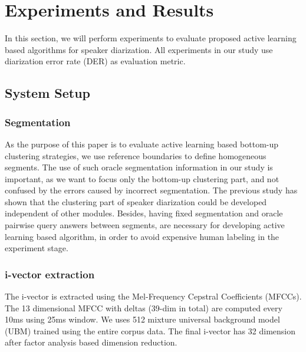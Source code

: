 \documentclass[journal]{IEEEtran}
\begin{document}
\section{Experiments and Results}
In this section, we will perform experiments to evaluate proposed active learning based algorithms for speaker diarization. All experiments in our study use diarization error rate (DER) as evaluation metric.
\subsection{System Setup}
\subsubsection{Segmentation}
As the purpose of this paper is to evaluate active learning based bottom-up clustering strategies, we use reference boundaries to define homogeneous segments. The use of such oracle segmentation information in our study is important, as we want to focus only the bottom-up clustering part, and not confused by the errors caused by incorrect segmentation. The previous study has shown that the clustering part of speaker diarization could be developed independent of other modules. Besides, having fixed segmentation and oracle pairwise query answers between segments, are necessary for developing active learning based algorithm, in order to avoid expensive human labeling in the experiment stage.

\subsubsection{i-vector extraction}
The i-vector is extracted using the Mel-Frequency Cepstral Coefficients (MFCCs). The 13 dimensional MFCC with deltas (39-dim in total) are computed every 10ms using 25ms window. We uses 512 mixture universal background model (UBM) trained using the entire corpus data. The final i-vector has 32 dimension after factor analysis based dimension reduction. 
\end{document}

